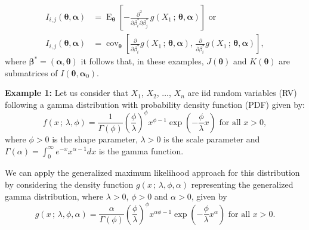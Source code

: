 \documentclass[10pt,a4paper,onecolumn]{article} %
\newcommand{\bs}{\boldsymbol}
\newcommand{\on}{\operatorname}
\begin{document}
 \begin{equation}\label{eqj}
 \begin{aligned}I_{i,j}(\bs{\theta},\bs{\alpha})&=
 \on{E}_{\bs{\theta}} \left[-\frac{\partial^2}{\partial \beta^*_i \partial\beta^*_j}\, g(X_1\, ;\, \bs{\theta},\bs{\alpha})\right]\mbox{ or}\\
 I_{i,j}(\bs{\theta},\bs{\alpha}) &=  \on{cov}_{\bs{\theta}} \left[\frac{\partial}{\partial \beta^*_i} g(X_1\, ;\, \bs{\theta}, \bs{\alpha}),\, \frac{\partial}{\partial \beta^*_i} g(X_1\, ;\, \bs{\theta},\bs{\alpha})\right],
 \end{aligned}
 \end{equation}
where $\bs{\beta}^*=(\bs{\alpha},\bs{\theta})$ it follows that, in these examples, $J(\bs{\theta})$ and $K(\bs{\theta})$ are submatrices of $I(\bs{\theta},\bs{\alpha}_0)$.

\noindent\textbf{Example 1:} Let us consider that $X_1$, $X_2$, $\ldots$, $X_n$   are iid random variables (RV) following a gamma distribution with probability density function (PDF) given by:
\begin{equation}\label{fdpgamma}
f(x\,;\,\lambda,\phi)=\frac{1}{\Gamma(\phi)}\left(\frac{\phi}{\lambda} \right)^{\phi} x^{\phi-1}\exp\left(-\frac{\phi}{\lambda} x \right)\mbox{ for all }x>0,
\end{equation}
where $\phi>0$ is the shape parameter,  $\lambda>0$ is the scale parameter and $\Gamma(\alpha)=\int_{0}^{\infty}{e^{-x}x^{\alpha-1}dx}$ is the  gamma function.

We can apply the generalized maximum likelihood approach for this distribution by considering the density function $g(x\,;\,\lambda,\phi,\alpha)$ representing the generalized gamma distribution,  where $\lambda>0$, $\phi>0$ and $\alpha>0$, given by
\begin{equation}\label{g}g(x\,;\,\lambda,\phi,\alpha)=\frac{\alpha}{\Gamma(\phi)}\left(\frac{\phi}{\lambda} \right)^\phi x^{\alpha\phi-1}\exp\left(-\frac{\phi}{\lambda} x^\alpha \right)\mbox{ for all }x>0.
\end{equation}
\end{document}
